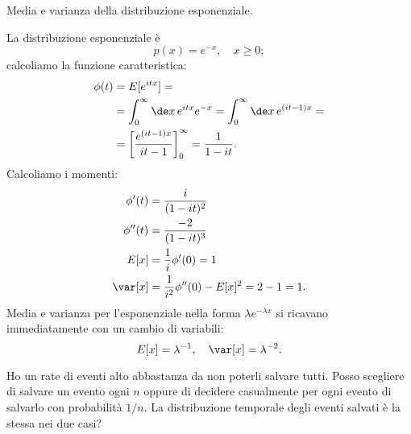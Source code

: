 \begin{exercise}
	Media e varianza della distribuzione esponenziale.
\end{exercise}

\begin{solution*}
	La distribuzione esponenziale è
	\begin{equation*}
		p(x) = e^{-x}, \quad x \ge 0;
	\end{equation*}
	calcoliamo la funzione caratteristica:
	\begin{align*}
		\phi(t) &=  E[e^{itx}] = \\
		&= \int_0^\infty \de x\, e^{itx}e^{-x} = \int_0^\infty \de x\, e^{(it-1)x} = \\
		&= \left[ \frac{e^{(it-1)x}}{it-1} \right]_0^\infty = \frac1{1-it}.
	\end{align*}
	Calcoliamo i momenti:
	\begin{align*}
		\phi'(t) &= \frac{i}{(1-it)^2} \\
		\phi''(t) &= \frac{-2}{(1-it)^3} \\
		E[x] &= \frac1i \phi'(0) = 1 \\
		\var[x] &= \frac1{i^2}\phi''(0) - E[x]^2 = 2 - 1 = 1.
	\end{align*}
	Media e varianza per l'esponenziale nella forma $\lambda e^{-\lambda x}$ si ricavano immediatamente con un cambio di variabili:
	\begin{equation*}
		E[x] = \lambda^{-1}, \quad \var[x] = \lambda^{-2}.
	\end{equation*}
\end{solution*}

\begin{exercise}
	Ho un rate di eventi alto abbastanza da non poterli salvare tutti. Posso scegliere di salvare un evento ogni $n$ oppure di decidere casualmente per ogni evento di salvarlo con probabilità $1/n$. La distribuzione temporale degli eventi salvati è la stessa nei due casi?
\end{exercise}

